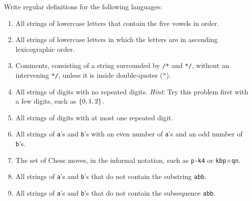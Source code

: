 \begin{exercise}\label{ex:030305}
    Write regular definitions for the following languages:
    \begin{enumerate}[label=\alph*)]
        \item All strings of lowercase letters that contain the five vowels in 
        order.
        \item All strings of lowercase letters in which the letters are in 
        ascending lexicographic order.
        \item Comments, consisting of a string surrounded by \texttt{/*} and 
        \texttt{*/}, without an intervening \texttt{*/}, unless it is inside 
        double-quotes (\texttt{"}).
        \item All strings of digits with no repeated digits. \emph{Hint}: Try 
        this problem first with a few digits, such as $\left\{ 0,1,2 \right\}$.
        \item All strings of digits with at most one repeated digit.
        \item All strings of \texttt{a}'s and \texttt{b}'s with an even number 
        of \texttt{a}'s and an odd number of \texttt{b}'s. 
        \item The set of Chess moves, in the informal notation, such as
        \texttt{{p-k4}} or \texttt{kbp}$\times$\texttt{qn}.
        \item All strings of \texttt{a}'s and \texttt{b}'s that do not contain
        the substring \texttt{abb}.
        \item All strings of \texttt{a}'s and \texttt{b}'s that do not contain
        the subsequence \texttt{abb}.
    \end{enumerate}
\end{exercise}
